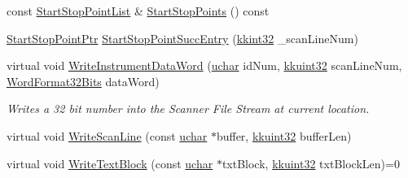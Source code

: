 \begin{DoxyCompactItemize}
\item 
const \hyperlink{class_k_k_l_s_c_1_1_start_stop_point_list}{Start\+Stop\+Point\+List} \& \hyperlink{class_k_k_l_s_c_1_1_scanner_file_a805bb1bed628106ca676eafeab1de42a}{Start\+Stop\+Points} () const 
\item 
\hyperlink{namespace_k_k_l_s_c_ad7242c9e21790e237095cdd24ce21361}{Start\+Stop\+Point\+Ptr} \hyperlink{class_k_k_l_s_c_1_1_scanner_file_a13eb18f7cd09c699f7decfb158bfdede}{Start\+Stop\+Point\+Succ\+Entry} (\hyperlink{namespace_k_k_b_a8fa4952cc84fda1de4bec1fbdd8d5b1b}{kkint32} \+\_\+scan\+Line\+Num)
\item 
virtual void \hyperlink{class_k_k_l_s_c_1_1_scanner_file_a15dd633d00b43b110448ec21697b28a8}{Write\+Instrument\+Data\+Word} (\hyperlink{namespace_k_k_b_ace9969169bf514f9ee6185186949cdf7}{uchar} id\+Num, \hyperlink{namespace_k_k_b_af8d832f05c54994a1cce25bd5743e19a}{kkuint32} scan\+Line\+Num, \hyperlink{union_k_k_b_1_1_word_format32_bits}{Word\+Format32\+Bits} data\+Word)
\begin{DoxyCompactList}\small\item\em Writes a 32 bit number into the Scanner File Stream at current location. \end{DoxyCompactList}\item 
virtual void \hyperlink{class_k_k_l_s_c_1_1_scanner_file_a5d97c6e77d704e4163b0923faeea8c84}{Write\+Scan\+Line} (const \hyperlink{namespace_k_k_b_ace9969169bf514f9ee6185186949cdf7}{uchar} $\ast$buffer, \hyperlink{namespace_k_k_b_af8d832f05c54994a1cce25bd5743e19a}{kkuint32} buffer\+Len)
\item 
virtual void \hyperlink{class_k_k_l_s_c_1_1_scanner_file_ade81ae552ed646a84a334c49163b9a12}{Write\+Text\+Block} (const \hyperlink{namespace_k_k_b_ace9969169bf514f9ee6185186949cdf7}{uchar} $\ast$txt\+Block, \hyperlink{namespace_k_k_b_af8d832f05c54994a1cce25bd5743e19a}{kkuint32} txt\+Block\+Len)=0
\end{DoxyCompactItemize}
